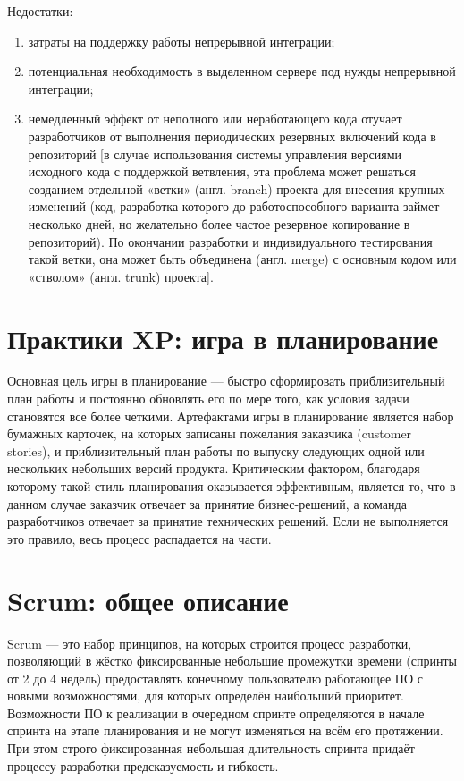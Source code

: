 \documentclass{article}
\let\stdsection\section
\renewcommand\section{\newpage\stdsection}
\begin{document}
    Недостатки:
    \begin{enumerate}
        \item затраты на поддержку работы непрерывной интеграции;
        \item потенциальная необходимость в выделенном сервере под нужды непрерывной интеграции;
        \item немедленный эффект от неполного или неработающего кода отучает разработчиков от выполнения периодических резервных включений кода в репозиторий [в случае использования системы управления версиями исходного кода с поддержкой ветвления, эта проблема может решаться созданием отдельной «ветки» (англ. branch) проекта для внесения крупных изменений (код, разработка которого до работоспособного варианта займет несколько дней, но желательно более частое резервное копирование в репозиторий). По окончании разработки и индивидуального тестирования такой ветки, она может быть объединена (англ. merge) с основным кодом или «стволом» (англ. trunk) проекта].
    \end{enumerate}

\section{Практики XP: игра в планирование}
    Основная цель игры в планирование — быстро сформировать приблизительный план работы и постоянно обновлять его по мере того, как условия задачи становятся все более четкими. Артефактами игры в планирование является набор бумажных карточек, на которых записаны пожелания заказчика (customer stories), и приблизительный план работы по выпуску следующих одной или нескольких небольших версий продукта. Критическим фактором, благодаря которому такой стиль планирования оказывается эффективным, является то, что в данном случае заказчик отвечает за принятие бизнес-решений, а команда разработчиков отвечает за принятие технических решений. Если не выполняется это правило, весь процесс распадается на части.

\section{Scrum: общее описание}
    Scrum — это набор принципов, на которых строится процесс разработки, позволяющий в жёстко фиксированные небольшие промежутки времени (спринты от 2 до 4 недель) предоставлять конечному пользователю работающее ПО с новыми возможностями, для которых определён наибольший приоритет. Возможности ПО к реализации в очередном спринте определяются в начале спринта на этапе планирования и не могут изменяться на всём его протяжении. При этом строго фиксированная небольшая длительность спринта придаёт процессу разработки предсказуемость и гибкость.
\end{document}
